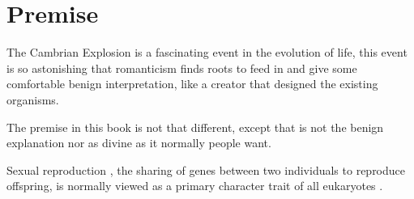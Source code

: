 \chapter{Premise}

The Cambrian Explosion is a fascinating event in the evolution  of life, this
event is so astonishing that romanticism finds roots to feed in and give some
comfortable benign interpretation, like a creator that designed the existing organisms.

The premise in this book is not that different, except that is not the benign explanation
nor as divine as it normally people want.

Sexual reproduction , the sharing of genes between two individuals to reproduce offspring, is normally viewed
as a primary character trait of all eukaryotes \cite{revolutions_made_earth_91}.


\printbibliography[heading=subbibliography]


